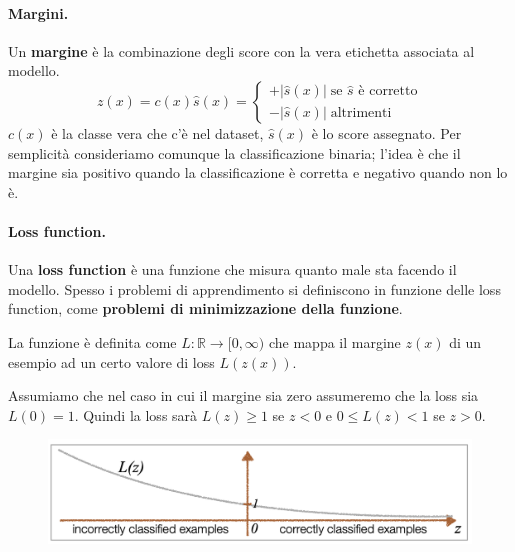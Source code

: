 \paragraph{Margini.} Un \textbf{margine} è la combinazione degli score con la vera etichetta associata al modello.
\begin{equation}
    z(x)=c(x)\hat{s}(x)=\begin{cases}
        +\left|\hat{s}(x) \right| \; \text{se }\hat{s}\text{ è corretto} \\ 
        -\left|\hat{s}(x) \right| \; \text{altrimenti}
\end{cases}
\end{equation}
$c(x)$ è la classe vera che c'è nel dataset, $\hat{s}(x)$ è lo score assegnato. Per semplicità consideriamo comunque la classificazione binaria; l'idea è che il margine sia positivo quando la classificazione è corretta e negativo quando non lo è.

\paragraph{Loss function.} Una \textbf{loss function} è una funzione che misura quanto male sta facendo il modello. Spesso i problemi di apprendimento si definiscono in funzione delle loss function, come \textbf{problemi di minimizzazione della funzione}.

La funzione è definita come $L: \mathbb{R} \rightarrow [0,\infty)$ che mappa il margine $z(x)$ di un esempio ad un certo valore di loss $L(z(x))$.

Assumiamo che nel caso in cui il margine sia zero assumeremo che la loss sia $L(0)=1$. Quindi la loss sarà $L(z) \ge 1$ se $z<0$ e $0\le L(z)<1$ se $z>0$.

\begin{figure}[!h]
    \centering
    \includegraphics[scale=0.7]{images/lossFun.png}
    \label{fig:enter-label}
\end{figure}

